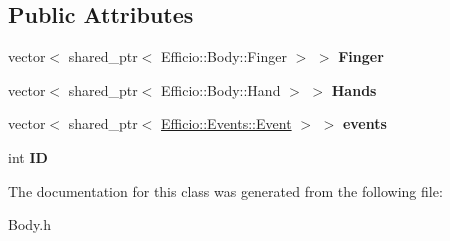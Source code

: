 \subsection*{Public Attributes}
\begin{DoxyCompactItemize}
\item 
vector$<$ shared\+\_\+ptr$<$ Efficio\+::\+Body\+::\+Finger $>$ $>$ {\bfseries Finger}\hypertarget{class_efficio_1_1_body_addda49a5c2eb6ae7b60ec2d7465cbdf7}{}\label{class_efficio_1_1_body_addda49a5c2eb6ae7b60ec2d7465cbdf7}

\item 
vector$<$ shared\+\_\+ptr$<$ Efficio\+::\+Body\+::\+Hand $>$ $>$ {\bfseries Hands}\hypertarget{class_efficio_1_1_body_a7d30f51e82ab834c976beac1183a115f}{}\label{class_efficio_1_1_body_a7d30f51e82ab834c976beac1183a115f}

\item 
vector$<$ shared\+\_\+ptr$<$ \hyperlink{class_efficio_1_1_events_1_1_event}{Efficio\+::\+Events\+::\+Event} $>$ $>$ {\bfseries events}\hypertarget{class_efficio_1_1_body_a13f535b3541b6ea9b4bedfafd1512b46}{}\label{class_efficio_1_1_body_a13f535b3541b6ea9b4bedfafd1512b46}

\item 
int {\bfseries ID}\hypertarget{class_efficio_1_1_body_a58fe808d6666d9678a36b2eb0e62822a}{}\label{class_efficio_1_1_body_a58fe808d6666d9678a36b2eb0e62822a}

\end{DoxyCompactItemize}


The documentation for this class was generated from the following file\+:\begin{DoxyCompactItemize}
\item 
Body.\+h\end{DoxyCompactItemize}
